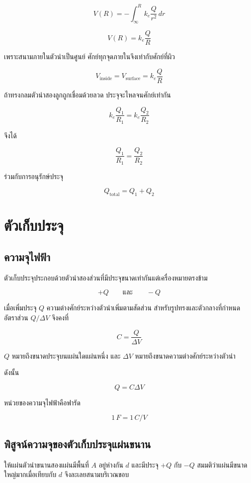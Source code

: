 \[
V(R)
=-\int_{\infty}^{R}k_e\frac{Q}{r^2}\,dr
\]

\[
V(R)=k_e\frac{Q}{R}
\]

เพราะสนามภายในตัวนำเป็นศูนย์ ศักย์ทุกจุดภายในจึงเท่ากับศักย์ที่ผิว

\[
\boxed{V_{\text{inside}}=V_{\text{surface}}=k_e\frac{Q}{R}}
\]

ถ้าทรงกลมตัวนำสองลูกถูกเชื่อมด้วยลวด ประจุจะไหลจนศักย์เท่ากัน

\[
k_e\frac{Q_1}{R_1}=k_e\frac{Q_2}{R_2}
\]

จึงได้

\[
\frac{Q_1}{R_1}=\frac{Q_2}{R_2}
\]

ร่วมกับการอนุรักษ์ประจุ

\[
Q_{\text{total}}=Q_1+Q_2
\]

\section{ตัวเก็บประจุ}

\subsection{ความจุไฟฟ้า}

ตัวเก็บประจุประกอบด้วยตัวนำสองส่วนที่มีประจุขนาดเท่ากันแต่เครื่องหมายตรงข้าม

\[
+Q\qquad\text{และ}\qquad-Q
\]

เมื่อเพิ่มประจุ $Q$ ความต่างศักย์ระหว่างตัวนำเพิ่มตามสัดส่วน สำหรับรูปทรงและตัวกลางที่กำหนด อัตราส่วน $Q/\Delta V$ จึงคงที่

\begin{tcolorbox}[title=นิยามความจุไฟฟ้า]
\[
\boxed{C=\frac{Q}{\Delta V}}
\]

$Q$ หมายถึงขนาดประจุบนแผ่นใดแผ่นหนึ่ง และ $\Delta V$ หมายถึงขนาดความต่างศักย์ระหว่างตัวนำ
\end{tcolorbox}

ดังนั้น

\[
Q=C\Delta V
\]

หน่วยของความจุไฟฟ้าคือฟารัด

\[
1\,\si{F}=1\,\si{C/V}
\]

\subsection{พิสูจน์ความจุของตัวเก็บประจุแผ่นขนาน}

ให้แผ่นตัวนำขนานสองแผ่นมีพื้นที่ $A$ อยู่ห่างกัน $d$ และมีประจุ $+Q$ กับ $-Q$ สมมติว่าแผ่นมีขนาดใหญ่มากเมื่อเทียบกับ $d$ จึงละเลยสนามบริเวณขอบ

